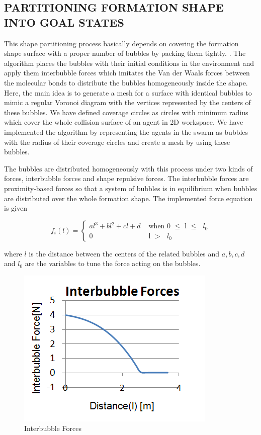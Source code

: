 \documentclass[letterpaper, 10 pt, conference]{ieeeconf}  %
\begin{document}
\subsection{PARTITIONING FORMATION SHAPE INTO GOAL STATES} \label{Partitioning_ref}		
This shape partitioning process basically depends on covering the formation shape surface with a proper number of bubbles by packing them tightly. \cite{27}.  The algorithm places the bubbles with their initial conditions in the environment and apply them interbubble forces which imitates the Van der Waals forces between the molecular bonds  to distribute the bubbles homogeneously inside the shape. Here, the main idea is to generate a mesh for a surface with identical bubbles to mimic a regular Voronoi diagram with the vertices represented by the centers of these bubbles. We have defined coverage circles as circles with minimum radius which cover the whole collision surface of an agent in 2D workspace. We have implemented the algorithm by representing the agents in the swarm as bubbles with the radius of their coverage circles and create a mesh by using these bubbles. 
			
The bubbles are distributed homogeneously with this process under two kinds of forces, interbubble forces and shape repulsive forces. The interbubble forces are proximity-based forces so that a system of bubbles is in equilibrium when bubbles are distributed over the whole formation shape. The implemented force equation is given
		
\begin{equation}
f_i(l) = \left\{ \begin{array}{rl}
al^3 + bl^2 + cl + d &\mbox{ when 0 $\leq$ l $\leq$ $l_0$} \\
0                               &\mbox{ l $>$ $l_0$}
\end{array} \right.
\end{equation}

where $l$ is the distance between the centers of the related bubbles and $a,b,c,d$ and $l_0$ are the variables to tune the force acting on the bubbles. 

    \begin{figure}[thpb]
      \centering     
      \includegraphics[scale = 0.4]{interbubble_forces}
     \caption{Interbubble Forces}
   \end{figure}   
   	
\end{document}

